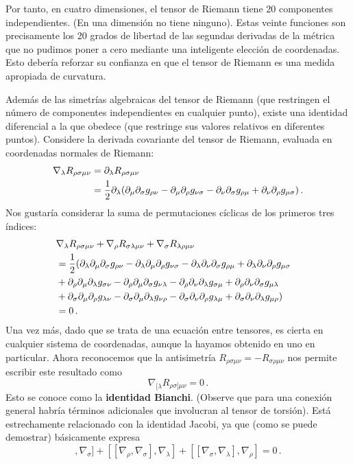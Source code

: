 \documentclass[11pt,b5paper,openany,twoside]{book}
\newcommand{\mn}{{\mu\nu}}
\newcommand{\p}[1]{{\partial_{#1}}}
\begin{document}
Por tanto, en cuatro dimensiones, el tensor de Riemann tiene 20 componentes independientes.
(En una dimensión no tiene ninguno).
Estas veinte funciones son precisamente los 20 grados de libertad de las segundas derivadas de la métrica que no pudimos poner a cero mediante una inteligente elección de coordenadas.
Esto debería reforzar su confianza en que el tensor de Riemann es una medida apropiada de curvatura.

Además de las simetrías algebraicas del tensor de Riemann (que restringen el número de componentes independientes en cualquier punto), existe una identidad diferencial a la que obedece (que restringe sus valores relativos en diferentes puntos).
Considere la derivada covariante del tensor de Riemann, evaluada en coordenadas normales de Riemann:
\begin{align}
\nabla_\lambda R_{\rho\sigma\mn}&= \p\lambda
R_{\rho\sigma\mn} \notag \\
&=  {1\over 2}\p\lambda(\p\mu\p\sigma g_{\rho\nu}
-\p\mu\p\rho g_{\nu\sigma} - \p\nu\p\sigma g_{\rho\mu}
+\p\nu\p\rho g_{\mu\sigma})\,. \label{3.86}
\end{align}
Nos gustaría considerar la suma de permutaciones cíclicas de los primeros tres índices:
\begin{align}
\lefteqn{\nabla_\lambda R_{\rho\sigma\mn} +
\nabla_\rho R_{\sigma\lambda\mn}+\nabla_\sigma R_{\lambda\rho\mn}}  \notag \\
&=  {1\over 2}
(\p\lambda\p\mu\p\sigma g_{\rho\nu} -\p\lambda\p\mu\p\rho g_{\nu\sigma}
-\p\lambda\p\nu\p\sigma g_{\rho\mu}+\p\lambda\p\nu\p\rho g_{\mu\sigma} \notag \\
& +\p\rho\p\mu\p\lambda g_{\sigma\nu} -\p\rho\p\mu\p\sigma g_{\nu\lambda}
-\p\rho\p\nu\p\lambda g_{\sigma\mu}+\p\rho\p\nu\p\sigma g_{\mu\lambda} \notag \\
& +\p\sigma\p\mu\p\rho g_{\lambda\nu} -\p\sigma\p\mu\p\lambda g_{\nu\rho}
-\p\sigma\p\nu\p\rho g_{\lambda\mu}+\p\sigma\p\nu\p\lambda g_{\mu\rho})
\notag \\  &= 0\,.\label{3.87}
\end{align}
Una vez más, dado que se trata de una ecuación entre tensores, es cierta en cualquier sistema de coordenadas, aunque la hayamos obtenido en uno en particular.
Ahora reconocemos que la antisimetría $R_{\rho\sigma\mn}=- R_{\sigma\rho\mn}$ nos permite escribir este resultado como
\begin{equation}
\nabla_{[\lambda}R_{\rho\sigma]\mn}=0\,.\label{3.88}
\end{equation}
Esto se conoce como la {\bf identidad Bianchi}.
(Observe que para una conexión general habría términos adicionales que involucran al tensor de torsión).
Está estrechamente relacionado con la identidad Jacobi, ya que (como se puede demostrar) básicamente expresa
\begin{equation}
[[\nabla_\lambda,\nabla_\rho],\nabla_\sigma]
+[[\nabla_\rho,\nabla_\sigma],\nabla_\lambda]
+[[\nabla_\sigma,\nabla_\lambda],\nabla_\rho]=0\,.\label{3.89}
\end{equation}
\end{document}
